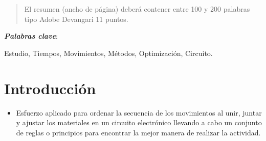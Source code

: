     \maketitle
    \thispagestyle{fancy}
    
    
    
    \begin{abstract}
    \noindent 
    El resumen (ancho de página) deberá contener entre 100 y 200 palabras tipo Adobe Devangari 11 puntos.
    
    \end{abstract}
    \textbf{\textit{Palabras clave}}:
    
        Estudio, Tiempos, Movimientos, Métodos, Optimización, Circuito. 
    
    \section{Introducción}
    
    \begin{itemize}
    \item Esfuerzo aplicado para ordenar la secuencia de los movimientos al unir, juntar y ajustar los materiales en un circuito electrónico llevando a cabo un conjunto de reglas o principios para encontrar la mejor manera de realizar la actividad.\cite{RAE}
    \end{itemize}
    
